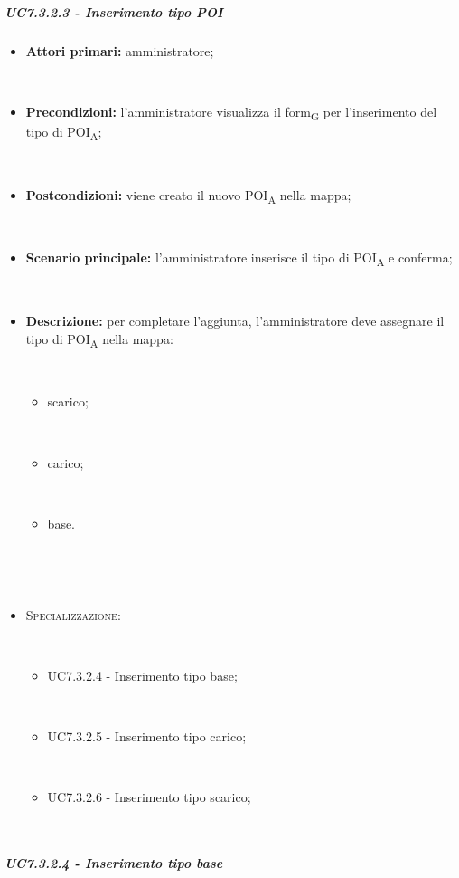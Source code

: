 \subparagraph{UC7.3.2.3 - Inserimento tipo POI}

\begin{itemize}

​    \item   \textbf{Attori primari:} amministratore;

​    \item   \textbf{Precondizioni:} l'amministratore visualizza il form\textsubscript{G} per l'inserimento del tipo di POI\textsubscript{A};

​    \item   \textbf{Postcondizioni:} viene creato il nuovo POI\textsubscript{A} nella mappa; 

​    \item   \textbf{Scenario principale:} l'amministratore inserisce il tipo di POI\textsubscript{A} e conferma;

​    \item   \textbf{Descrizione:} per completare l'aggiunta, l'amministratore deve assegnare il tipo di POI\textsubscript{A} nella mappa:

​    \begin{itemize}

​        \item scarico;

​        \item carico;

​        \item base.

​    \end{itemize}

​    \item   \textsc{Specializzazione:}

​    \begin{itemize}

​        \item UC7.3.2.4 - Inserimento tipo base;

​        \item UC7.3.2.5 - Inserimento tipo carico;

​        \item UC7.3.2.6 - Inserimento tipo scarico;

​    \end{itemize}



\end{itemize}



\subparagraph{UC7.3.2.4 - Inserimento tipo base}

